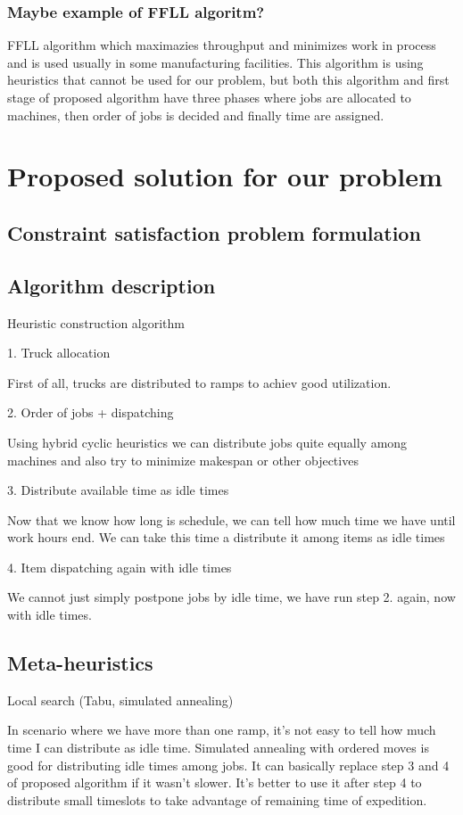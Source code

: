 \documentclass{ctuthesis}
\begin{document}
\subsection{Maybe example of FFLL algoritm?}
FFLL algorithm which maximazies throughput and minimizes work in process and is used usually in some manufacturing facilities. This algorithm is using heuristics that cannot be used for our problem, but both this algorithm and first stage of proposed algorithm have three phases where jobs are allocated to machines, then order of jobs is decided and finally time are assigned. 
\chapter{Proposed solution for our problem}
\section{Constraint satisfaction problem formulation}
\section{Algorithm description}
Heuristic construction algorithm

1. Truck allocation

First of all, trucks are distributed to ramps to achiev good utilization.

2. Order of jobs + dispatching

Using hybrid cyclic heuristics we can distribute jobs quite equally among machines and also try to minimize makespan or other objectives

3. Distribute available time as idle times

Now that we know how long is schedule, we can tell how much time we have until work hours end. We can take this time a distribute it among items as idle times

4. Item dispatching again with idle times

We cannot just simply postpone jobs by idle time, we have run step 2. again, now with idle times.


\section{Meta-heuristics}
Local search (Tabu, simulated annealing)

In scenario where we have more than one ramp, it's not easy to tell how much time I can distribute as idle time. Simulated annealing with ordered moves is good for distributing idle times among jobs. It can basically replace step 3 and 4 of proposed algorithm if it wasn't slower. It's better to use it after step 4 to distribute small timeslots to take advantage of remaining time of expedition.
\end{document}
